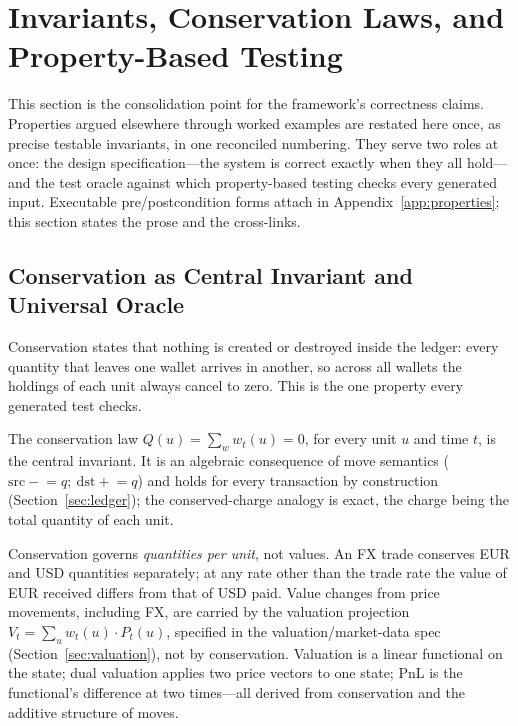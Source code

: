\section{Invariants, Conservation Laws, and Property-Based Testing}
\label{sec:sec15}
\label{sec:invariants}%

This section is the consolidation point for the framework's correctness claims. Properties argued elsewhere through worked examples are restated here once, as precise testable invariants, in one reconciled numbering. They serve two roles at once: the design specification---the system is correct exactly when they all hold---and the test oracle against which property-based testing checks every generated input. Executable pre/postcondition forms attach in Appendix~\ref{app:properties}; this section states the prose and the cross-links.

\subsection{Conservation as Central Invariant and Universal Oracle}
\label{sec:sec15-conservation}

Conservation states that nothing is created or destroyed inside the ledger: every quantity that leaves one wallet arrives in another, so across all wallets the holdings of each unit always cancel to zero. This is the one property every generated test checks.

The conservation law $Q(u)=\sum_w w_t(u)=0$, for every unit $u$ and time $t$, is the central invariant. It is an algebraic consequence of move semantics ($\mathrm{src}\mathrel{-}=q;\ \mathrm{dst}\mathrel{+}=q$) and holds for every transaction by construction (Section~\ref{sec:ledger}); the conserved-charge analogy is exact, the charge being the total quantity of each unit.

Conservation governs \emph{quantities per unit}, not values. An FX trade conserves EUR and USD quantities separately; at any rate other than the trade rate the value of EUR received differs from that of USD paid. Value changes from price movements, including FX, are carried by the valuation projection $V_t=\sum_u w_t(u)\cdot P_t(u)$, specified in the valuation/market-data spec (Section~\ref{sec:valuation}), not by conservation. Valuation is a linear functional on the state; dual valuation applies two price vectors to one state; PnL is the functional's difference at two times---all derived from conservation and the additive structure of moves.

